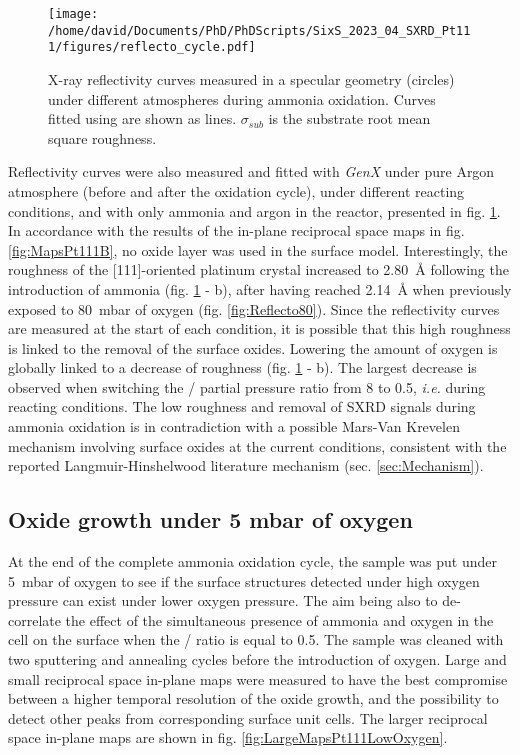 \begin{figure}[!htb]
    \centering
    \texttt{[image: /home/david/Documents/PhD/PhDScripts/SixS\_2023\_04\_SXRD\_Pt111/figures/reflecto\_cycle.pdf]}
    \caption{
    	X-ray reflectivity curves measured in a specular geometry (circles) under different atmospheres during ammonia oxidation.
        Curves fitted using  are shown as lines.
        $\sigma_{sub}$ is the substrate root mean square roughness.
        }
    \label{fig:ReflectoCycle}
\end{figure}

Reflectivity curves were also measured and fitted with \textit{GenX} under pure Argon atmosphere (before and after the oxidation cycle), under different reacting conditions, and with only ammonia and argon in the reactor, presented in fig. \ref{fig:ReflectoCycle}.
In accordance with the results of the in-plane reciprocal space maps in fig. \ref{fig:MapsPt111B}, no oxide layer was used in the surface model.
Interestingly, the roughness of the [111]-oriented platinum crystal increased to \qty{2.80}{\angstrom} following the introduction of ammonia (fig. \ref{fig:ReflectoCycle} - b), after having reached \qty{2.14}{\angstrom} when previously exposed to \qty{80}{\milli\bar} of oxygen (fig. \ref{fig:Reflecto80}).
Since the reflectivity curves are measured at the start of each condition, it is possible that this high roughness is linked to the removal of the surface oxides.
Lowering the amount of oxygen is globally linked to a decrease of roughness (fig. \ref{fig:ReflectoCycle} - b).
The largest decrease is observed when switching the / partial pressure ratio from 8 to 0.5, \textit{i.e.} during reacting conditions.
The low roughness and removal of SXRD signals during ammonia oxidation is in contradiction with a possible Mars-Van Krevelen mechanism involving surface oxides at the current conditions, consistent with the reported Langmuir-Hinshelwood literature mechanism (sec. \ref{sec:Mechanism}).

\subsection{Oxide growth under 5 mbar of oxygen}

At the end of the complete ammonia oxidation cycle, the sample was put under \qty{5}{\milli\bar} of oxygen to see if the surface structures detected under high oxygen pressure can exist under lower oxygen pressure.
The aim being also to de-correlate the effect of the simultaneous presence of ammonia and oxygen in the cell on the surface when the / ratio is equal to \num{0.5}.
The sample was cleaned with two sputtering and annealing cycles before the introduction of oxygen.
Large and small reciprocal space in-plane maps were measured to have the best compromise between a higher temporal resolution of the oxide growth, and the possibility to detect other peaks from corresponding surface unit cells.
The larger reciprocal space in-plane maps are shown in fig. \ref{fig:LargeMapsPt111LowOxygen}.

